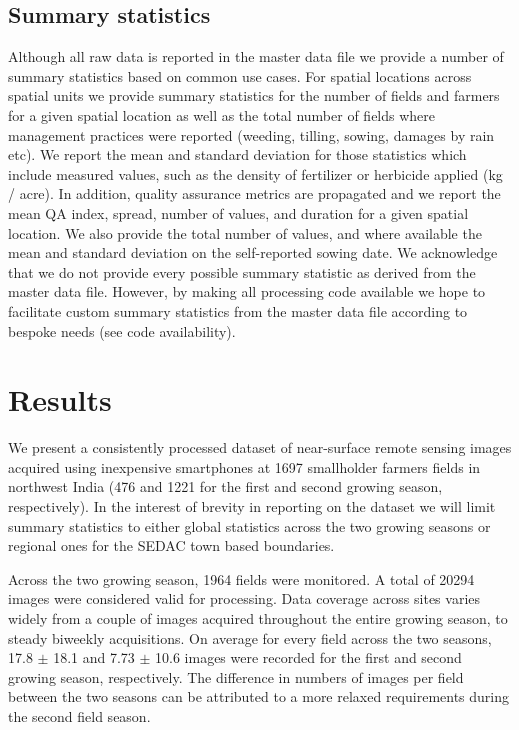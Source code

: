 \documentclass[, manuscript]{copernicus}
\begin{document}
\subsection{Summary statistics}

Although all raw data is reported in the master data file we provide a
number of summary statistics based on common use cases. For spatial
locations across spatial units we provide summary statistics for the
number of fields and farmers for a given spatial location as well as the
total number of fields where management practices were reported
(weeding, tilling, sowing, damages by rain etc). We report the mean and
standard deviation for those statistics which include measured values,
such as the density of fertilizer or herbicide applied (kg / acre). In
addition, quality assurance metrics are propagated and we report the
mean QA index, spread, number of values, and duration for a given
spatial location. We also provide the total number of values, and where
available the mean and standard deviation on the self-reported sowing
date. We acknowledge that we do not provide every possible summary
statistic as derived from the master data file. However, by making all
processing code available we hope to facilitate custom summary
statistics from the master data file according to bespoke needs (see
code availability).

\section{Results}

We present a consistently processed dataset of near-surface remote
sensing images acquired using inexpensive smartphones at 1697
smallholder farmers fields in northwest India (476 and 1221 for the
first and second growing season, respectively). In the interest of
brevity in reporting on the dataset we will limit summary statistics to
either global statistics across the two growing seasons or regional ones
for the SEDAC town based boundaries.

Across the two growing season, 1964 fields were monitored. A total of
20294 images were considered valid for processing. Data coverage across
sites varies widely from a couple of images acquired throughout the
entire growing season, to steady biweekly acquisitions. On average for
every field across the two seasons, 17.8 \(\pm\) 18.1 and 7.73 \(\pm\)
10.6 images were recorded for the first and second growing season,
respectively. The difference in numbers of images per field between the
two seasons can be attributed to a more relaxed requirements during the
second field season.
\end{document}
